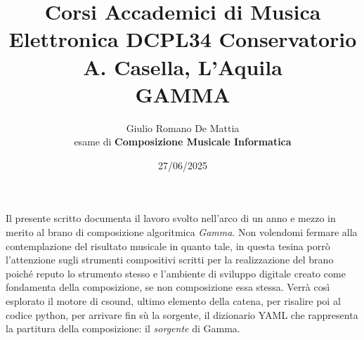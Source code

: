 \documentclass[a4paper,12pt]{article}
\title{Corsi Accademici di Musica Elettronica DCPL34 Conservatorio A. Casella, L'Aquila \\ \fontsize{14}{17}\bfseries\uppercase{Gamma}}
\author{Giulio Romano De Mattia \\ esame di \bfseries{Composizione Musicale Informatica} }
\date{27/06/2025}
\begin{document}
\maketitle
\thispagestyle{empty}

\begin{center}
    \vspace{1cm}
    \textbf{\fontsize{12}{15}\selectfont{Sommario}}
\end{center}

Il presente scritto documenta il lavoro svolto nell'arco di un anno e mezzo in merito al brano di composizione algoritmica \textit{Gamma}. Non volendomi fermare 
alla contemplazione del risultato musicale in quanto tale, in questa tesina porrò l'attenzione sugli strumenti compositivi scritti per la realizzazione 
del brano poiché reputo lo strumento stesso e l'ambiente di sviluppo digitale creato come fondamenta della composizione, se non composizione essa stessa. 
Verrà così esplorato il motore di csound, ultimo elemento della catena, per risalire poi al codice python, per arrivare fin sù la sorgente, il dizionario YAML che rappresenta la partitura della composizione: il \textit{sorgente} di Gamma.



\newpage
\tableofcontents  

\newpage



%
%
\end{document}
